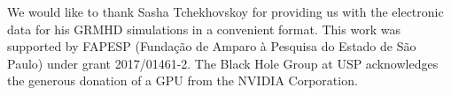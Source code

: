\documentclass[twocolumn, linenumbers]{aastex62} %
\begin{document}
\acknowledgments

We would like to thank Sasha Tchekhovskoy for providing us with the electronic data for his GRMHD simulations in a convenient format. 
This work was supported by FAPESP (Funda\c{c}\~ao de Amparo \`a Pesquisa do Estado de S\~ao Paulo) under grant 2017/01461-2. The Black Hole Group at USP acknowledges the generous donation of a GPU from the NVIDIA Corporation. %

\vspace{5mm}










\end{document}
